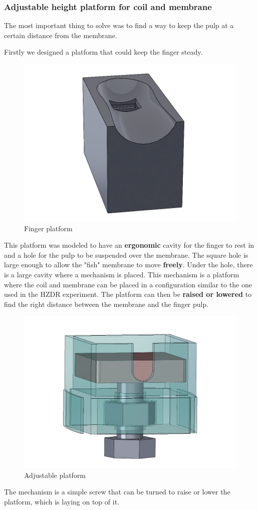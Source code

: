 \subsubsection{Adjustable height platform for coil and membrane}
The most important thing to solve was to find a way to keep the pulp at a certain distance from the membrane.

\begin{samepage}
    Firstly we designed a platform that could keep the finger steady.
    \nopagebreak

    \begin{figure}[H]
        \centering
        \includegraphics[width=0.5\linewidth]{Chapters/Chapter5/Rigid_Prototypes/Figures/finger_holder.png}
        \caption{Finger platform}
        \label{fig: finger_platform}
    \end{figure}
\end{samepage}

This platform was modeled to have an \textbf{ergonomic} cavity for the finger to rest in and a hole for the pulp to be suspended over the membrane.
The square hole is large enough to allow the "fish" membrane to move \textbf{freely}.
Under the hole, there is a large cavity where a mechanism is placed.
This mechanism is a platform where the coil and membrane can be placed in a configuration similar to the one used in the HZDR experiment.
The platform can then be \textbf{raised or lowered} to find the right distance between the membrane and the finger pulp.
\begin{figure}[H]
    \centering
    \includegraphics[width = 0.5\linewidth]{Chapters/Chapter5/Rigid_Prototypes/Figures/adj_platform.png}
    \caption{Adjustable platform}
    \label{fig: adj_platform}
\end{figure}
The mechanism is a simple screw that can be turned to raise or lower the platform, which is laying on top of it.

